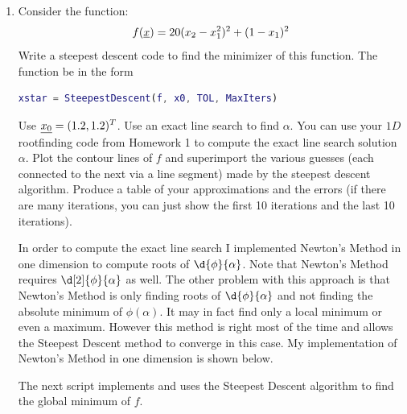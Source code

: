 \documentclass[11pt, oneside]{article}
\begin{document}
\begin{enumerate}
  \item %
    Consider the function:
    \[
      f(\underline{x}) = 20(x_2 - x_1^2)^2 + (1 - x_1)^2
    \]
    Write a \MATLAB steepest descent code to find the minimizer of this function.
    The function be in the form
    \begin{lstlisting}[language=MATLAB, frame=none]
      xstar = SteepestDescent(f, x0, TOL, MaxIters)
    \end{lstlisting}
    Use $\underline{x_0} = (1.2, 1.2)^T$.
    Use an exact line search to find $\alpha$.
    You can use your $1D$ rootfinding code from Homework 1 to compute the exact
    line search solution $\alpha$.
    Plot the contour lines of $f$ and superimport the various guesses (each
    connected to the next via a line segment) made by the steepest descent
    algorithm.
    Produce a table of your approximations and the errors (if there are many
    iterations, you can just show the first 10 iterations and the last 10
    iterations).

    In order to compute the exact line search I implemented Newton's Method in
    one dimension to compute roots of $\d{\phi}{\alpha}$.
    Note that Newton's Method requires $\d[2]{\phi}{\alpha}$ as well.
    The other problem with this approach is that Newton's Method is only
    finding roots of $\d{\phi}{\alpha}$ and not finding the absolute minimum of
    $\phi(\alpha)$.
    It may in fact find only a local minimum or even a maximum.
    However this method is right most of the time and allows the Steepest Descent
    method to converge in this case.
    My implementation of Newton's Method in one dimension is shown below.
    
    The next script implements and uses the Steepest Descent algorithm to find
    the global minimum of $f$.
    


\end{enumerate}
\end{document}
